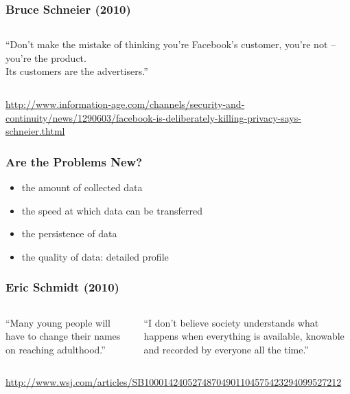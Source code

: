 \documentclass[dvipsnames]{beamer}
\theoremstyle{plain}
\begin{document}
\begin{frame}
  \frametitle{Bruce Schneier (2010)}

  \begin{columns}

    ``Don't make the mistake of thinking you're Facebook's customer, you're not
      -- you're the product.\\
      Its customers are the advertisers.''
  \end{columns}

  \medskip
  \tiny{\url{http://www.information-age.com/channels/security-and-continuity/news/1290603/facebook-is-deliberately-killing-privacy-says-schneier.thtml}}\\
\end{frame}

\begin{frame}
  \frametitle{Are the Problems New?}

  \begin{itemize}
    \item the amount of collected data
    \item the speed at which data can be transferred
    \item the persistence of data
    \item the quality of data: detailed profile
  \end{itemize}
\end{frame}

\begin{frame}
  \frametitle{Eric Schmidt (2010)}

  \begin{columns}

    ``Many young people will have to change their names on reaching adulthood.''

    \pause
    \medskip
    ``I don't believe society understands what happens when everything is
      available, knowable and recorded by everyone all the time.''
  \end{columns}

  \medskip
  \tiny{\url{http://www.wsj.com/articles/SB10001424052748704901104575423294099527212}}\\
\end{frame}
\end{document}
